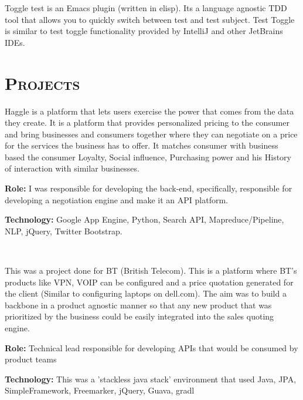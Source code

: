 \begin{resume}
\begin{position}
Toggle test is an Emacs plugin (written in elisp). Its a language agnostic TDD tool that allows you to quickly switch between test and test subject. Test Toggle is similar to test toggle functionality provided by IntelliJ and other JetBrains IDEs.
\end{position}

\section{\textsc{Projects}}

\begin{position}
Haggle is a platform that lets users exercise the power that comes from the data they create. It is a platform that provides personalized pricing to the consumer and bring businesses and consumers together where they can negotiate on a price for the services the business has to offer. It matches consumer with business based the consumer Loyalty, Social influence, Purchasing power and his History of interaction with similar businesses.

{\textbf{Role:}} I was responsible for developing the back-end, specifically, responsible for developing a negotiation engine and make it an API platform.

{\textbf{Technology:}} Google App Engine, Python, Search API, Mapreduce/Pipeline, NLP, jQuery, Twitter Bootstrap. 
\end{position}\\

\begin{position}
This was a project done for  BT (British Telecom). This is a platform where BT's products like VPN, VOIP can be configured and a price quotation generated for the client (Similar to configuring laptops on dell.com). The aim was to build a backbone in
a product agnostic manner so that any new product that was prioritized by the business could be easily integrated into the sales quoting engine.

{\textbf{Role:}} Technical lead responsible for developing APIs that would be consumed by product teams

{\textbf{Technology:}} This was a 'stackless java stack' environment that used Java, JPA, SimpleFramework, Freemarker, jQuery, Guava, gradl
\end{position}\\


\end{resume}
